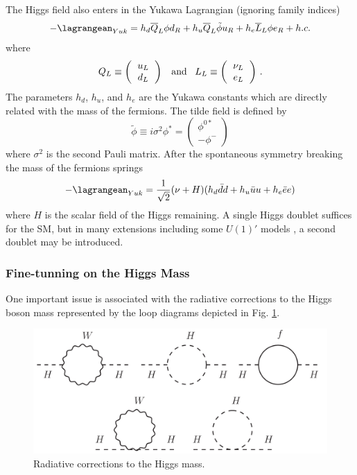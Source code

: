 The Higgs field also enters in the Yukawa Lagrangian (ignoring family indices)
\begin{equation}
-\lagrangean_{Yuk} = h_d \overline{Q}_L\phi d_R + h_u\overline{Q}_L\tilde{\phi}u_R + h_e \overline{L}_L\phi e_R  + h.c.
\end{equation}
where 
\begin{equation}
Q_L \equiv \left(\begin{tabular}{c} $u_L$ \\ $d_L$ \end{tabular}\right) \;\;\; \mbox{and}  \;\;\;  L_L \equiv \left(\begin{tabular}{c} $\nu_L$ \\ $e_L$ \end{tabular}\right)\,.
\end{equation}
The parameters $h_d$, $h_u$, and $h_e$ are the Yukawa constants which are directly related with the mass of the fermions. The tilde field is defined by
\begin{equation}
\tilde{\phi}\equiv i\sigma^2\phi^*=\left(\begin{matrix} \phi^{0*} \\ -\phi^- \end{matrix} \right)
\end{equation}
where $\sigma^2$ is the second Pauli matrix. After the spontaneous symmetry breaking the mass of the fermions springs
\begin{equation}
-\lagrangean_{Yuk}=\frac{1}{\sqrt{2}}(\nu+H)(h_d\bar{d}d + h_u\bar{u}u + h_e\bar{e}e)
\end{equation}
where $H$ is the scalar field of the Higgs remaining. A single Higgs doublet suffices for the SM, but in many extensions including some $U(1)'$ models \cite{Langacker:2010zza}, a second doublet may be introduced.

\subsubsection*{Fine-tunning on the Higgs Mass}

One important issue is associated with the radiative corrections to the Higgs boson mass represented by the loop diagrams depicted in Fig. \ref{higgsVirtual}.  
\begin{figure}[htb!!]
\centering
\includegraphics[scale=0.5]{figures/theory/Higgs_Virtual.pdf}
\caption[Radiative corrections to the Higgs mass]{Radiative corrections to the Higgs mass.}
\label{higgsVirtual}
\end{figure}

